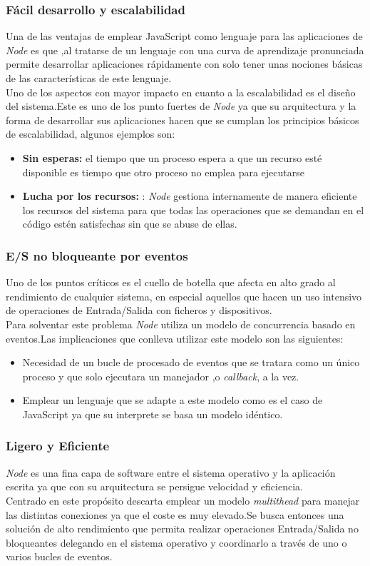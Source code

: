 \subsubsection*{Fácil desarrollo y escalabilidad}
Una de las ventajas de emplear JavaScript como lenguaje para las aplicaciones de \textit{Node} es que ,al tratarse de un lenguaje con una curva de aprendizaje pronunciada permite desarrollar aplicaciones rápidamente con solo tener unas nociones básicas de las características de este lenguaje.
\\Uno de los aspectos con mayor impacto en cuanto a la escalabilidad es el diseño del sistema.Este es uno de los punto fuertes de \textit{Node} ya que su arquitectura y la forma de desarrollar sus aplicaciones hacen que se cumplan los principios básicos de escalabilidad, algunos ejemplos son:
\begin{itemize}
\item \textbf{Sin esperas:} el tiempo que un proceso espera a que un recurso esté disponible es tiempo que otro proceso no emplea para ejecutarse
\item \textbf{Lucha por los recursos:} : \textit{Node} gestiona internamente de manera eficiente los recursos del sistema para que todas las operaciones que se demandan en el código estén satisfechas sin que se abuse de ellas.
\end{itemize}
\subsubsection*{E/S no bloqueante por eventos}
Uno de los puntos críticos es el cuello de botella que afecta en alto grado al rendimiento de cualquier sistema, en especial aquellos que hacen un uso intensivo de operaciones de Entrada/Salida con ficheros y dispositivos.
\\Para solventar este problema \textit{Node} utiliza un modelo de concurrencia basado en eventos.Las implicaciones que conlleva utilizar este modelo son las siguientes:
\begin{itemize}
\item Necesidad de un bucle de procesado de eventos que se tratara como un único proceso y que solo ejecutara un manejador ,o \textit{callback}, a la vez.
\item  Emplear un lenguaje que se adapte a este modelo como es el caso de JavaScript ya que su interprete se basa un modelo idéntico.
\end{itemize}
\subsubsection*{Ligero y Eficiente}
\textit{Node} es una fina capa de software entre el sistema operativo y la aplicación escrita ya que con su arquitectura se persigue velocidad y eficiencia.
\\Centrado en este propósito descarta emplear un modelo \textit{multithead} para manejar las distintas conexiones ya que el coste es muy elevado.Se busca entonces una solución de alto rendimiento que permita realizar operaciones Entrada/Salida no bloqueantes delegando en el sistema operativo y coordinarlo a través de uno o varios bucles de eventos.

